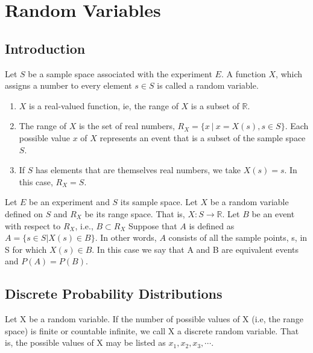 \chapter{Random Variables}

\section{Introduction}
\begin{definition}
Let $S$ be a sample space associated with the experiment $E$. A function $X$, which assigns a number to every element $s \in S$ is called a random variable.
\end{definition}

\begin{note}
\end{note}
\begin{enumerate}
    \item $X$ is a real-valued function, ie, the range of $X$ is a subset of $\mathbb{R}$.
    \item The range of $X$ is the set of real numbers, $R_X = \{ x \ |\  x = X(s), s \in S \}$. Each possible value $x$ of $X$ represents an event that is a subset of the sample space $S$.
    \item If $S$ has elements that are themselves real numbers, we take $X(s) = s$. In this case, $R_X = S$.
\end{enumerate}


\begin{definition}
Let $E$ be an experiment and $S$ its sample space. Let $X$ be a random variable defined on $S$ and $R_X$ be its range space. That is, $X: S \xrightarrow{} \mathbb{R}$. Let $B$ be an event with respect to $R_X$, i.e., $B \subset R_X$
Suppose that $A$ is defined as $A = \{ s \in S | X(s) \in B \}$. In other words, $A$ consists of all the sample points, s, in S for which $X(s) \in B$. In this case we say that A and B are equivalent events and $P(A) = P(B).$
\end{definition}

\section{Discrete Probability Distributions}

\begin{definition}
Let X be a random variable. If the number of possible values of X (i.e, the range space) is finite or countable infinite, we call X a discrete random variable. That is, the possible values of X may be listed as $x_1, x_2, x_3, \cdots$.
\end{definition}

